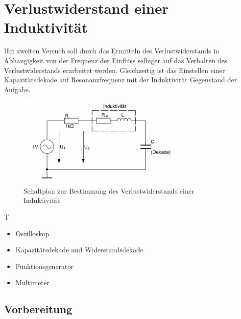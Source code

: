 \documentclass{article}
\begin{document}
\section{Verlustwiderstand einer Induktivität}
\begin{task}
  IIm zweiten Versuch soll durch das Ermitteln des Verlustwiderstands in Abhängigkeit von der Frequenz der Einfluss selbiger auf das Verhalten des Verlustwiderstands erarbeitet werden.
  Gleichzeitig ist das Einstellen einer Kapazitätsdekade auf Resonanzfrequenz mit der Induktivität Gegenstand der Aufgabe.
\end{task}
\begin{figure}[h]
  \begin{center}
    \includegraphics[scale=1]{assets/images/Versuch2Schaltplan.PNG}
    \caption{Schaltplan zur Bestimmung des Verlustwiderstands einer Induktivität}
  \end{center}
\end{figure}
\begin{devlist}
  T
  \begin{itemize}
    \item Oszilloskop
    \item Kapazitätsdekade und Widerstandsdekade
    \item Funktionsgenerator
    \item Multimeter
  \end{itemize}
\end{devlist}
\subsection{Vorbereitung}
\end{document}
